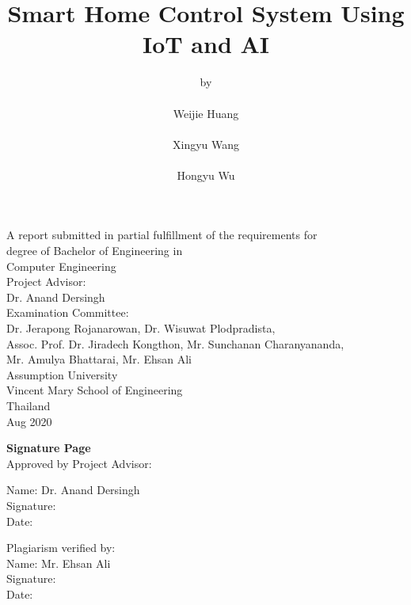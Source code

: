 \documentclass[a4paper,12pt]{article}
\title{\textbf{Smart Home Control System Using IoT and AI}}
\author{by\\\\
	Weijie Huang\\\\
	Xingyu Wang\\\\
	Hongyu Wu}
\date{}
\begin{document}
\singlespacing
	\maketitle
	\begin{center}
		A report submitted in partial fulfillment of the requirements for \\degree of Bachelor of Engineering in\\ Computer Engineering\\[1in]

		Project Advisor:\\[0.1in] Dr. Anand Dersingh\\[0.2in] Examination Committee:\\[0.1in]

		Dr. Jerapong Rojanarowan, Dr. Wisuwat Plodpradista,\\

		Assoc. Prof. Dr. Jiradech Kongthon, Mr. Sunchanan Charanyananda,\\

		Mr. Amulya Bhattarai, Mr. Ehsan Ali\\[0.4in]

		Assumption University\\
		Vincent Mary School of Engineering\\
		Thailand\\
		Aug 2020
	\end{center}
\clearpage

\begin{flushleft}
\textbf{Signature Page}\\[0.2in]
Approved by Project Advisor:\\[0.2in]
\end{flushleft}
\setlength{\leftskip}{10cm} Name: Dr. Anand Dersingh\\[0.2in]
Signature:\underline{\hspace{3cm}}\\[0.2in]
Date:\underline{\hspace{3.9cm}}\\[0.2in]

\begin{flushleft}
Plagiarism verified by:\\[0.2in]
\setlength{\leftskip}{10cm} Name: Mr. Ehsan Ali\\[0.2in]
Signature:\underline{\hspace{3cm}}\\[0.2in]
Date:\underline{\hspace{3.9cm}}\\[0.2in]
\end{flushleft}
\end{document}
